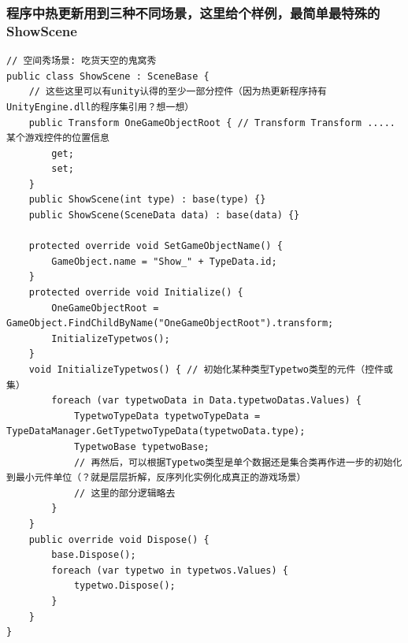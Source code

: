 \documentclass[9pt, b5paper]{article}
\begin{document}
\subsubsection{程序中热更新用到三种不同场景，这里给个样例，最简单最特殊的ShowScene}
\label{sec-9-2-2}
\begin{verbatim}
// 空间秀场景: 吃货天空的鬼窝秀
public class ShowScene : SceneBase {
    // 这些这里可以有unity认得的至少一部分控件（因为热更新程序持有UnityEngine.dll的程序集引用？想一想）
    public Transform OneGameObjectRoot { // Transform Transform ..... 某个游戏控件的位置信息
        get;
        set;
    }
    public ShowScene(int type) : base(type) {}
    public ShowScene(SceneData data) : base(data) {}

    protected override void SetGameObjectName() {
        GameObject.name = "Show_" + TypeData.id;
    }
    protected override void Initialize() {
        OneGameObjectRoot = GameObject.FindChildByName("OneGameObjectRoot").transform;
        InitializeTypetwos();
    }
    void InitializeTypetwos() { // 初始化某种类型Typetwo类型的元件（控件或集）
        foreach (var typetwoData in Data.typetwoDatas.Values) {
            TypetwoTypeData typetwoTypeData = TypeDataManager.GetTypetwoTypeData(typetwoData.type);
            TypetwoBase typetwoBase;
            // 再然后，可以根据Typetwo类型是单个数据还是集合类再作进一步的初始化到最小元件单位（？就是层层折解，反序列化实例化成真正的游戏场景）
            // 这里的部分逻辑略去
        }
    }
    public override void Dispose() {
        base.Dispose();
        foreach (var typetwo in typetwos.Values) {
            typetwo.Dispose();
        }
    }
}
\end{verbatim}
\end{document}

